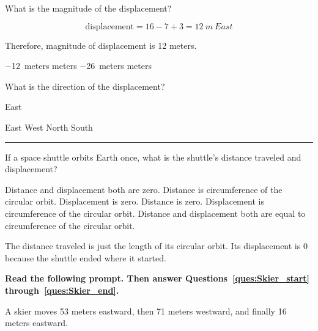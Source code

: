 \documentclass[]{exam}
\begin{document}
\begin{questions}
\question
What is the magnitude of the displacement?

\begin{solution}
\begin{equation*}
  \mathrm{displacement} = 16 - 7 + 3 = \SI{12}{m \ East}  
\end{equation*}

Therefore, magnitude of displacement is 12 meters.
\end{solution}

\begin{choices}
\choice \SI{-12}{meters}
 meters
\choice \SI{-26}{meters}
 meters
\end{choices}

\question \label{ques:cat_end}
What is the direction of the displacement?

\begin{solution}
East
\end{solution}

\begin{choices}
\CorrectChoice East
\choice West
\choice North
\choice South
\end{choices}

\vspace{1em} \hrule

\question
If a space shuttle orbits Earth once, what is the shuttle’s distance traveled and displacement?

\begin{choices}
\choice Distance and displacement both are zero.
\CorrectChoice Distance is circumference of the circular orbit. Displacement is zero.
\choice Distance is zero. Displacement is circumference of the circular orbit.
\choice Distance and displacement both are equal to circumference of the circular orbit.
\end{choices}

\begin{solution}
The distance traveled is just the length of its circular orbit. Its displacement is 0 because the shuttle ended where it started.
\end{solution}

\begin{EnvUplevel}
\textbf{Read the following prompt. Then answer Questions~\ref{ques:Skier_start} through~\ref{ques:Skier_end}.}

A skier moves 53 meters eastward, then 71 meters westward, and finally 16 meters eastward. 
\end{EnvUplevel}



\end{questions}
\end{document}
